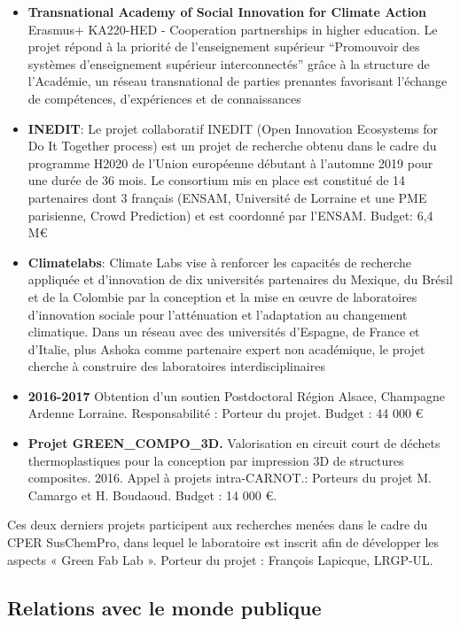 \documentclass[
  11pt,
]{article}
\begin{document}
\begin{itemize}
\item
  \textbf{Transnational Academy of Social Innovation for Climate Action}
  Erasmus+ KA220-HED - Cooperation partnerships in higher education. Le
  projet répond à la priorité de l'enseignement supérieur ``Promouvoir
  des systèmes d'enseignement supérieur interconnectés'' grâce à la
  structure de l'Académie, un réseau transnational de parties prenantes
  favorisant l'échange de compétences, d'expériences et de connaissances
\item
  \textbf{INEDIT}: Le projet collaboratif INEDIT (Open Innovation
  Ecosystems for Do It Together process) est un projet de recherche
  obtenu dans le cadre du programme H2020 de l'Union européenne débutant
  à l'automne 2019 pour une durée de 36 mois. Le consortium mis en place
  est constitué de 14 partenaires dont 3 français (ENSAM, Université de
  Lorraine et une PME parisienne, Crowd Prediction) et est coordonné par
  l'ENSAM. Budget: 6,4 M€
\item
  \textbf{Climatelabs}: Climate Labs vise à renforcer les capacités de
  recherche appliquée et d'innovation de dix universités partenaires du
  Mexique, du Brésil et de la Colombie par la conception et la mise en
  œuvre de laboratoires d'innovation sociale pour l'atténuation et
  l'adaptation au changement climatique. Dans un réseau avec des
  universités d'Espagne, de France et d'Italie, plus Ashoka comme
  partenaire expert non académique, le projet cherche à construire des
  laboratoires interdisciplinaires
\item
  \textbf{2016-2017} Obtention d'un soutien Postdoctoral Région Alsace,
  Champagne Ardenne Lorraine. Responsabilité : Porteur du projet. Budget
  : 44 000 €
\item
  \textbf{Projet GREEN\_COMPO\_3D.} Valorisation en circuit court de
  déchets thermoplastiques pour la conception par impression 3D de
  structures composites. 2016. Appel à projets intra-CARNOT.: Porteurs
  du projet M. Camargo et H. Boudaoud. Budget : 14 000 €.
\end{itemize}

Ces deux derniers projets participent aux recherches menées dans le
cadre du CPER SusChemPro, dans lequel le laboratoire est inscrit afin de
développer les aspects « Green Fab Lab ». Porteur du projet : François
Lapicque, LRGP-UL.

\hypertarget{relations-avec-le-monde-publique}{%
\subsection{Relations avec le monde
publique}\label{relations-avec-le-monde-publique}}
\end{document}
